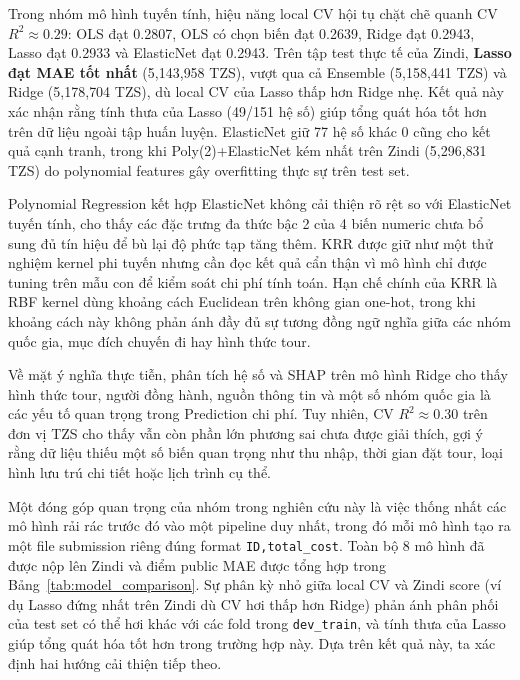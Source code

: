 Trong nhóm mô hình tuyến tính, hiệu năng local CV hội tụ chặt chẽ quanh CV $R^2 \approx 0.29$: OLS đạt 0.2807, OLS có chọn biến đạt 0.2639, Ridge đạt 0.2943, Lasso đạt 0.2933 và ElasticNet đạt 0.2943. Trên tập test thực tế của Zindi, \textbf{Lasso đạt MAE tốt nhất} (5{,}143{,}958 TZS), vượt qua cả Ensemble (5{,}158{,}441 TZS) và Ridge (5{,}178{,}704 TZS), dù local CV của Lasso thấp hơn Ridge nhẹ. Kết quả này xác nhận rằng tính thưa của Lasso (49/151 hệ số) giúp tổng quát hóa tốt hơn trên dữ liệu ngoài tập huấn luyện. ElasticNet giữ 77 hệ số khác 0 cũng cho kết quả cạnh tranh, trong khi Poly(2)+ElasticNet kém nhất trên Zindi (5{,}296{,}831 TZS) do polynomial features gây overfitting thực sự trên test set.

Polynomial Regression kết hợp ElasticNet không cải thiện rõ rệt so với ElasticNet tuyến tính, cho thấy các đặc trưng đa thức bậc 2 của 4 biến numeric chưa bổ sung đủ tín hiệu để bù lại độ phức tạp tăng thêm. KRR được giữ như một thử nghiệm kernel phi tuyến nhưng cần đọc kết quả cẩn thận vì mô hình chỉ được tuning trên mẫu con để kiểm soát chi phí tính toán. Hạn chế chính của KRR là RBF kernel dùng khoảng cách Euclidean trên không gian one-hot, trong khi khoảng cách này không phản ánh đầy đủ sự tương đồng ngữ nghĩa giữa các nhóm quốc gia, mục đích chuyến đi hay hình thức tour.

Về mặt ý nghĩa thực tiễn, phân tích hệ số và SHAP trên mô hình Ridge cho thấy hình thức tour, người đồng hành, nguồn thông tin và một số nhóm quốc gia là các yếu tố quan trọng trong Prediction chi phí. Tuy nhiên, CV $R^2 \approx 0.30$ trên đơn vị TZS cho thấy vẫn còn phần lớn phương sai chưa được giải thích, gợi ý rằng dữ liệu thiếu một số biến quan trọng như thu nhập, thời gian đặt tour, loại hình lưu trú chi tiết hoặc lịch trình cụ thể.


Một đóng góp quan trọng của nhóm trong nghiên cứu này là việc thống nhất các mô hình rải rác trước đó vào một pipeline duy nhất, trong đó mỗi mô hình tạo ra một file submission riêng đúng format \texttt{ID,total\_cost}. Toàn bộ 8 mô hình đã được nộp lên Zindi và điểm public MAE được tổng hợp trong Bảng~\ref{tab:model_comparison}. Sự phân kỳ nhỏ giữa local CV và Zindi score (ví dụ Lasso đứng nhất trên Zindi dù CV hơi thấp hơn Ridge) phản ánh phân phối của test set có thể hơi khác với các fold trong \texttt{dev\_train}, và tính thưa của Lasso giúp tổng quát hóa tốt hơn trong trường hợp này. Dựa trên kết quả này, ta xác định hai hướng cải thiện tiếp theo.

